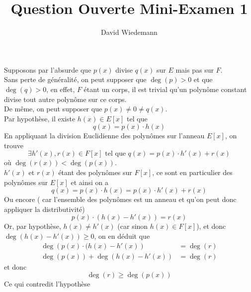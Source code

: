 \documentclass[11pt, a4paper]{article}
\begin{document}
\title{Question Ouverte Mini-Examen 1}
\author{David Wiedemann}
\maketitle
Supposons par l'absurde que $p( x) $ divise $q( x) $ sur $E$ mais pas sur $F$.\\
Sans perte de généralité, on peut supposer que $\deg( p) >0$ et que $\deg ( q) >0$, en effet, $F$ étant un  corps, il est trivial qu'un polynôme constant divise tout autre polynôme sur ce corps.\\
De même, on peut supposer que $p( x) \neq 0 \neq q( x) $.\\
Par hypothèse, il existe $h( x) \in E[x] $ tel que
\[ 
	q( x) = p( x)  \cdot h( x) 
\]
En appliquant la division Euclidienne des polynômes sur l'anneau $E[x]$, on trouve
\[ 
	\exists h'( x) , r( x)  \in F[x] \text{ tel que } q( x) = p( x) \cdot h'( x) + r( x) 
\]
où $\deg ( r( x) ) < \deg ( p( x) ) $.\\
$h'( x) $ et $r( x)$ étant des polynômes sur $F[x]$, ce sont en particulier des polynômes sur $E[x]$ et ainsi on a
\[ 
	q( x) = p( x) \cdot h( x) = p( x) \cdot h'( x) + r( x) 
\]
Ou encore ( car l'ensemble des polynômes est un anneau et qu'on peut donc appliquer la distributivité) 
\[ 
	p( x)  \cdot ( h( x) - h'( x) ) = r( x) 
\]
Or, par hypothèse, $h( x) \neq h'( x) $ (car sinon $h( x) \in F[x] $), et donc $\deg( h( x) - h'( x) ) \geq 0 $,  on en déduit que
\begin{align*}
	\deg \left( p( x) \cdot ( h( x) - h'( x)  \right) &= \deg ( r) \\
	\deg ( p( x)) +\deg   \left( h( x) - h'( x) \right)  &= \deg ( r) 
\end{align*}
et donc
\[ 
	\deg ( r) \geq \deg ( p( x) ) 
\]
Ce qui contredit l'hypothèse
\end{document}

